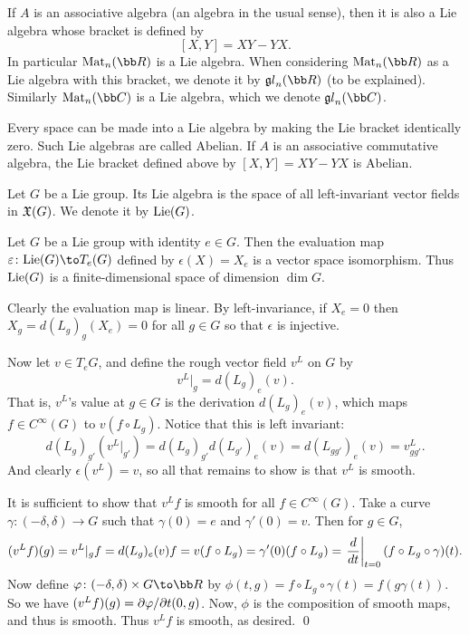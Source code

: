 \eexam

\bexam

    If $A$ is an associative algebra (an algebra in the usual sense), then it is also a Lie algebra whose bracket is defined by
    $$ [X,Y] = XY - YX . $$
    In particular $\mat_n(\bR)$ is a Lie algebra.
    When considering $\mat_n(\bR)$ as a Lie algebra with this bracket, we denote it by $\lgl_n(\bR)$ (to be explained).
    Similarly $\mat_n(\bC)$ is a Lie algebra, which we denote $\lgl_n(\bC)$.

\eexam

Every space can be made into a Lie algebra by making the Lie bracket identically zero.
Such Lie algebras are called {\emphcolor Abelian}.
If $A$ is an associative commutative algebra, the Lie bracket defined above by $[X,Y]=XY-YX$ is Abelian.

\bdefn

    Let $G$ be a Lie group.
    Its {\emphcolor Lie algebra} is the space of all left-invariant vector fields in ${\frak X}(G)$.
    We denote it by ${\rm Lie}(G)$.

\edefn

\bthrm

    Let $G$ be a Lie group with identity $e\in G$.
    Then the {\emphcolor evaluation map} $\epsilon\colon\lie(G)\to T_e(G)$ defined by $\epsilon(X)=X_e$ is a vector space isomorphism.
    Thus ${\rm Lie}(G)$ is a finite-dimensional space of dimension $\dim G$.

\ethrm

\bproof

    Clearly the evaluation map is linear.
    By left-invariance, if $X_e=0$ then $X_g=d(L_g)_g(X_e)=0$ for all $g\in G$ so that $\epsilon$ is injective.

    Now let $v\in T_eG$, and define the rough vector field $v^L$ on $G$ by
    $$ v^L|_g = d(L_g)_e(v) . $$
    That is, $v^L$'s value at $g\in G$ is the derivation $d(L_g)_e(v)$, which maps $f\in C^\infty(G)$ to $v(f\circ L_g)$.
    Notice that this is left invariant:
    $$ d(L_g)_{g'}(v^L|_{g'}) = d(L_g)_{g'}d(L_{g'})_e(v) = d(L_{gg'})_e(v) = v^L_{gg'} . $$
    And clearly $\epsilon(v^L)=v$, so all that remains to show is that $v^L$ is smooth.

    It is sufficient to show that $v^Lf$ is smooth for all $f\in C^\infty(G)$.
    Take a curve $\gamma\colon(-\delta,\delta)\to G$ such that $\gamma(0)=e$ and $\gamma'(0)=v$.
    Then for $g\in G$,
    $$ (v^Lf)(g) = v^L|_gf = d(L_g)_e(v)f = v(f\circ L_g) = \gamma'(0)(f\circ L_g) = \left.{{d}\over{dt}}\right|_{t=0}(f\circ L_g\circ\gamma)(t) . $$
    Now define $\phi\colon(-\delta,\delta)\times G\to\bR$ by $\phi(t,g)=f\circ L_g\circ\gamma(t)=f(g\gamma(t))$.
    So we have $(v^Lf)(g)=\partial \varphi/\partial t(0,g)$.
    Now, $\phi$ is the composition of smooth maps, and thus is smooth.
    Thus $v^Lf$ is smooth, as desired.
    \qed

